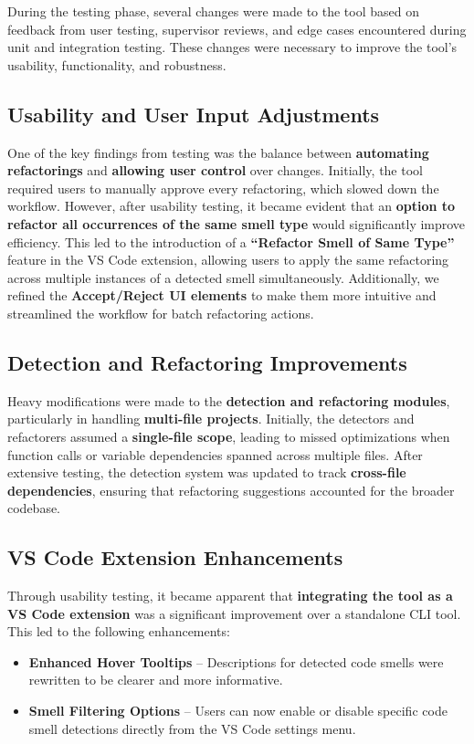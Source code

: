 \documentclass[12pt, titlepage]{article}
\begin{document}

During the testing phase, several changes were made to the tool based
on feedback from user testing, supervisor reviews, and edge cases
encountered during unit and integration testing. These changes were
necessary to improve the tool’s usability, functionality, and robustness.

\subsection{Usability and User Input Adjustments}
One of the key findings from testing was the balance between
\textbf{automating refactorings} and \textbf{allowing user control}
over changes. Initially, the tool required users to manually approve
every refactoring, which slowed down the workflow. However, after
usability testing, it became evident that an \textbf{option to
refactor all occurrences of the same smell type} would significantly
improve efficiency. This led to the introduction of a
\textbf{``Refactor Smell of Same Type''} feature in the VS Code
extension, allowing users to apply the same refactoring across
multiple instances of a detected smell simultaneously. Additionally,
we refined the \textbf{Accept/Reject UI elements} to make them more
intuitive and streamlined the workflow for batch refactoring actions.

\subsection{Detection and Refactoring Improvements}
Heavy modifications were made to the \textbf{detection and
refactoring modules}, particularly in handling \textbf{multi-file
projects}. Initially, the detectors and refactorers assumed a
\textbf{single-file scope}, leading to missed optimizations when
function calls or variable dependencies spanned across multiple
files. After extensive testing, the detection system was updated to
track \textbf{cross-file dependencies}, ensuring that refactoring
suggestions accounted for the broader codebase.

\subsection{VS Code Extension Enhancements}
Through usability testing, it became apparent that
\textbf{integrating the tool as a VS Code extension} was a
significant improvement over a standalone CLI tool. This led to the
following enhancements:
\begin{itemize}
  \item \textbf{Enhanced Hover Tooltips} – Descriptions for detected
    code smells were rewritten to be clearer and more informative.
  \item \textbf{Smell Filtering Options} – Users can now enable or
    disable specific code smell detections directly from the VS Code
    settings menu.
\end{itemize}
\end{document}
